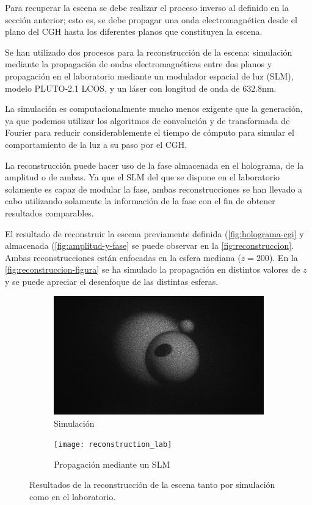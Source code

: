 \documentclass[10pt, a4paper]{article}
\begin{document}
Para recuperar la escena se debe realizar el proceso inverso al definido en la sección anterior; esto es, se debe propagar una onda electromagnética desde el plano del CGH hasta los diferentes planos que constituyen la escena.

Se han utilizado dos procesos para la reconstrucción de la escena: simulación mediante la propagación de ondas electromagnéticas entre dos planos y propagación en el laboratorio mediante un modulador espacial de luz (SLM), modelo PLUTO-2.1 LCOS, y un láser con longitud de onda de 632.8nm.

La simulación es computacionalmente mucho menos exigente que la generación, ya que podemos utilizar los algoritmos de convolución y de transformada de Fourier para reducir considerablemente el tiempo de cómputo para simular el comportamiento de la luz a su paso por el CGH.

La reconstrucción puede hacer uso de la fase almacenada en el holograma, de la amplitud o de ambas. Ya que el SLM del que se dispone en el laboratorio solamente es capaz de modular la fase, ambas reconstrucciones se han llevado a cabo utilizando solamente la información de la fase con el fin de obtener resultados comparables.

El resultado de reconstruir la escena previamente definida (\autoref{fig:holograma-cgi} y almacenada (\autoref{fig:amplitud-y-fase} se puede observar en la \autoref{fig:reconstruccion}. Ambas reconstrucciones están enfocadas en la esfera mediana ($z=200$). En la \autoref{fig:reconstruccion-figura} se ha simulado la propagación en distintos valores de $z$ y se puede apreciar el desenfoque de las distintas esferas.

\begin{figure}[H]
    \centering
    \begin{subfigure}{1\textwidth}
        \centering
        \includegraphics[width=1\textwidth]{simulated}
        \caption{Simulación}
        \label{fig:reconstruccion-simulacion}
    \end{subfigure}
    
    \begin{subfigure}{1\textwidth}
        \centering
        \texttt{[image: reconstruction\_lab]}
        \caption{Propagación mediante un SLM}
        \label{fig:reconstruccion-laboratorio}
    \end{subfigure}
    \caption{Resultados de la reconstrucción de la escena tanto por simulación como en el laboratorio.}
    \label{fig:reconstruccion}
\end{figure}
\end{document}

